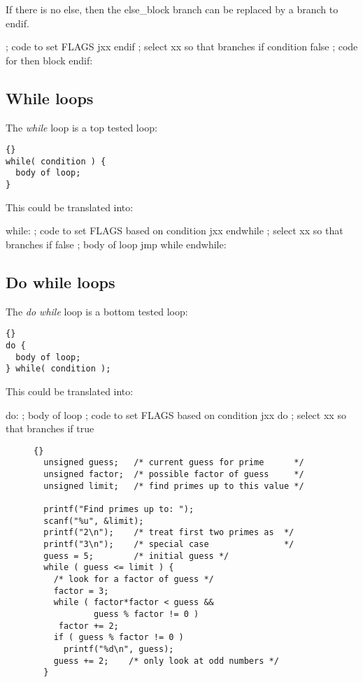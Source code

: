 If there is no else, then the {\code else\_block} branch can be replaced by
a branch to {\code endif}.
\begin{AsmCodeListing}[frame=none]
      ; code to set FLAGS
      jxx    endif          ; select xx so that branches if condition false
      ; code for then block
endif:
\end{AsmCodeListing}

\subsection{While loops }
The \emph{while} loop is a top tested loop:
\begin{lstlisting}[stepnumber=0]{}
while( condition ) {
  body of loop;
}
\end{lstlisting}
\noindent This could be translated into:
\begin{AsmCodeListing}[frame=none]
while:
      ; code to set FLAGS based on condition
      jxx    endwhile       ; select xx so that branches if false
      ; body of loop
      jmp    while
endwhile:
\end{AsmCodeListing}

\subsection{Do while loops }
The \emph{do while} loop is a bottom tested loop:
\begin{lstlisting}[stepnumber=0]{}
do {
  body of loop;
} while( condition );
\end{lstlisting}
\noindent This could be translated into:
\begin{AsmCodeListing}[frame=none]
do:
      ; body of loop
      ; code to set FLAGS based on condition
      jxx    do          ; select xx so that branches if true
\end{AsmCodeListing}

\begin{figure}[t]
\begin{lstlisting}[frame=tlrb]{}
  unsigned guess;   /* current guess for prime      */
  unsigned factor;  /* possible factor of guess     */
  unsigned limit;   /* find primes up to this value */

  printf("Find primes up to: ");
  scanf("%u", &limit);
  printf("2\n");    /* treat first two primes as  */
  printf("3\n");    /* special case               */
  guess = 5;        /* initial guess */
  while ( guess <= limit ) {
    /* look for a factor of guess */
    factor = 3;
    while ( factor*factor < guess &&
            guess % factor != 0 )
     factor += 2;
    if ( guess % factor != 0 )
      printf("%d\n", guess);
    guess += 2;    /* only look at odd numbers */
  }
\end{lstlisting}
\caption{}\label{fig:primec}
\end{figure}

